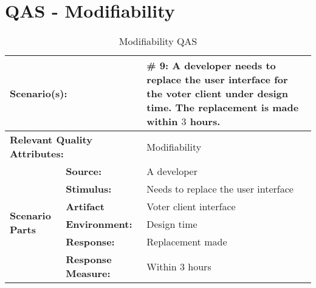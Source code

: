 \section{QAS - Modifiability}
\label{sec:the_remaining_qas:Modifiability}
\begin{table}[H]
\begin{center}
\begin{tabular}{|p{0.3cm}|p{2.5cm}|p{8cm}|}
  \hline
  \multicolumn{2}{|p{3cm}|}{\bfseries Scenario(s):} & \#  9: A developer needs to replace the user interface for the voter client under design time. The replacement is made within $3$ hours.\\
  \hline
  \multicolumn{2}{|p{3cm}|}{\bfseries Relevant Quality Attributes:} & Modifiability\\
  \hline
  \multirow{6}{*}{\begin{sideways}{\bfseries Scenario Parts}\end{sideways}}
  & {\bfseries Source:} & A developer \\
  \cline{2-3}
  & {\bfseries Stimulus:} & Needs to replace the user interface \\
  \cline{2-3}
  & {\bfseries Artifact} &  Voter client interface \\
  \cline{2-3}
  & {\bfseries Environment:} &  Design time \\
  \cline{2-3}
  & {\bfseries Response:} &  Replacement made\\
  \cline{2-3}
  & {\bfseries Response Measure:} &  Within 3 hours\\
  \hline
\end{tabular}
\caption{Modifiability QAS}
\end{center}
\end{table}

